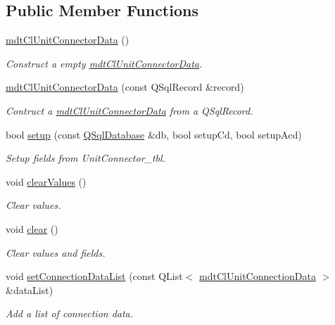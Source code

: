 \subsection*{Public Member Functions}
\begin{DoxyCompactItemize}
\item 
\hyperlink{classmdt_cl_unit_connector_data_a67140bc54965063f71d6f40d0a38ccca}{mdt\-Cl\-Unit\-Connector\-Data} ()
\begin{DoxyCompactList}\small\item\em Construct a empty \hyperlink{classmdt_cl_unit_connector_data}{mdt\-Cl\-Unit\-Connector\-Data}. \end{DoxyCompactList}\item 
\hyperlink{classmdt_cl_unit_connector_data_af70e73e59544ed4282fb10567634b4f4}{mdt\-Cl\-Unit\-Connector\-Data} (const Q\-Sql\-Record \&record)
\begin{DoxyCompactList}\small\item\em Contruct a \hyperlink{classmdt_cl_unit_connector_data}{mdt\-Cl\-Unit\-Connector\-Data} from a Q\-Sql\-Record. \end{DoxyCompactList}\item 
bool \hyperlink{classmdt_cl_unit_connector_data_a16e730eedccb32a198987ce26d4aa524}{setup} (const \hyperlink{class_q_sql_database}{Q\-Sql\-Database} \&db, bool setup\-Cd, bool setup\-Acd)
\begin{DoxyCompactList}\small\item\em Setup fields from Unit\-Connector\-\_\-tbl. \end{DoxyCompactList}\item 
void \hyperlink{classmdt_cl_unit_connector_data_a77be8b03d9cc6711aa30c4770fea4419}{clear\-Values} ()
\begin{DoxyCompactList}\small\item\em Clear values. \end{DoxyCompactList}\item 
void \hyperlink{classmdt_cl_unit_connector_data_a55918c459b5d4c67bbe12cffe9d006df}{clear} ()
\begin{DoxyCompactList}\small\item\em Clear values and fields. \end{DoxyCompactList}\item 
void \hyperlink{classmdt_cl_unit_connector_data_a46f01384d0310957841721f4d4f8d0e9}{set\-Connection\-Data\-List} (const Q\-List$<$ \hyperlink{classmdt_cl_unit_connection_data}{mdt\-Cl\-Unit\-Connection\-Data} $>$ \&data\-List)
\begin{DoxyCompactList}\small\item\em Add a list of connection data. \end{DoxyCompactList}\item 

\end{DoxyCompactItemize}
